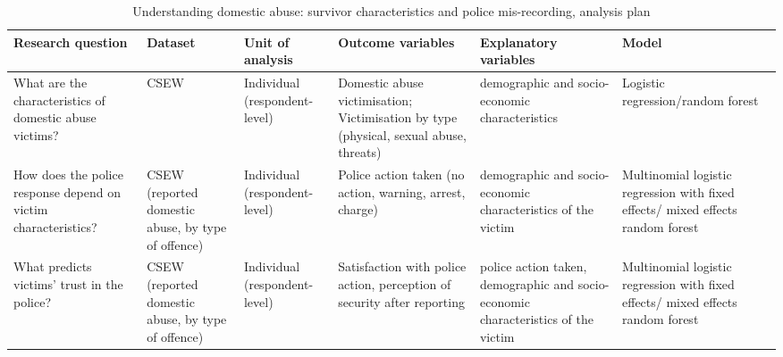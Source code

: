 \documentclass[11pt, a4paper]{article}
\begin{document}
\begin{table}[!htbp]
\caption{Understanding domestic abuse: survivor characteristics and police mis-recording, analysis plan}
  \begin{threeparttable}[t]
  \centering
       \begin{tabular}{ L{2.8cm}  C{1.8cm}  C{1.8cm}  C{3.2cm}  C{2.8cm}  C{2cm} }
    \toprule
     \textbf{Research question} & \textbf{Dataset}    & \textbf{Unit of analysis} & \textbf{Outcome variables} & \textbf{Explanatory variables} & \textbf{Model} \\
    \midrule
    What are the characteristics of domestic abuse victims? & CSEW & Individual (respondent-level) & Domestic abuse victimisation; Victimisation by type (physical, sexual abuse, threats) & demographic and socio-economic characteristics & Logistic regression/random forest \\
        \midrule
    How does the police response depend on victim characteristics? & CSEW (reported domestic abuse, by type of offence) & Individual (respondent-level) & Police action taken (no action, warning, arrest, charge) & demographic and socio-economic characteristics of the victim & Multinomial logistic regression with  fixed effects/ mixed effects random forest \\
     \midrule
    What predicts victims' trust in the police? & CSEW (reported domestic abuse, by type of offence) & Individual (respondent-level)& Satisfaction with police action, perception of security after reporting & police action taken, demographic and socio-economic characteristics of the victim & Multinomial logistic regression with fixed effects/ mixed effects random forest \\
     \bottomrule
  \end{tabular}
    \end{threeparttable}%
  \label{tab:addlabel}%
\end{table}%
\end{document}
